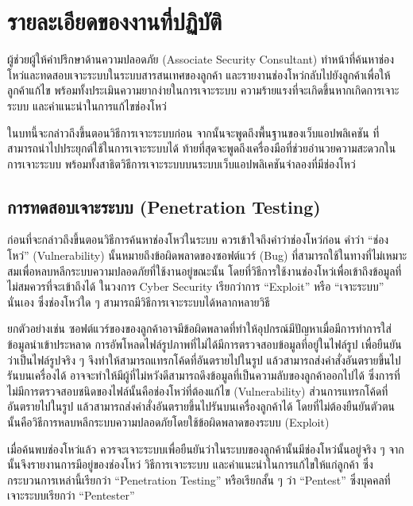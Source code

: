 \chapter{รายละเอียดของงานที่ปฏิบัติ}
\label{chapter:related-theory}

ผู้ช่วยผู้ให้คำปรึกษาด้านความปลอดภัย (Associate Security Consultant) ทำหน้าที่ค้นหาช่องโหว่และทดสอบเจาะระบบในระบบสารสนเทศของลูกค้า และรายงานช่องโหว่กลับไปยังลูกค้าเพื่อให้ลูกค้าแก้ไข พร้อมทั้งประเมินความยากง่ายในการเจาะระบบ ความร้ายแรงที่จะเกิดขึ้นหากเกิดการเจาะระบบ และคำแนะนำในการแก้ไขช่องโหว่

ในบทนี้จะกล่าวถึงขึ้นตอนวิธีการเจาะระบบก่อน จากนั้นจะพูดถึงพื้นฐานของเว็บแอปพลิเคชัน ที่สามารถนำไปประยุกต์ใช้ในการเจาะระบบได้ ท้ายที่สุดจะพูดถึงเครื่องมือที่ช่วยอำนวยความสะดวกในการเจาะระบบ พร้อมทั้งสาธิตวิธีการเจาะระบบบนระบบเว็บแอปพลิเคชันจำลองที่มีช่องโหว่

\section{การทดสอบเจาะระบบ (Penetration Testing)}

ก่อนที่จะกล่าวถึงขึ้นตอนวิธีการค้นหาช่องโหว่ในระบบ ควรเข้าใจถึงคำว่าช่องโหว่ก่อน คำว่า “ช่องโหว่” (Vulnerability) นั้นหมายถึงข้อผิดพลาดของซอฟต์แวร์ (Bug) ที่สามารถใช้ในทางที่ไม่เหมาะสมเพื่อหลบหลีกระบบความปลอดภัยที่ใช้งานอยู่ขณะนั้น โดยที่วิธีการใช้งานช่องโหว่เพื่อเข้าถึงข้อมูลที่ไม่สมควรที่จะเข้าถึงได้ ในวงการ Cyber Security เรียกว่าการ “Exploit” หรือ “เจาะระบบ” นั่นเอง \cite{what-is-an-exploit} ซึ่งช่องโหว่ใด ๆ สามารถมีวิธีการเจาะระบบได้หลากหลายวิธี

ยกตัวอย่างเช่น ซอฟต์แวร์ของของลูกค้าอาจมีข้อผิดพลาดที่ทำให้อุปกรณ์มีปัญหาเมื่อมีการทำการใส่ข้อมูลนำเข้าประหลาด การอัพโหลดไฟล์รูปภาพที่ไม่ได้มีการตรวจสอบข้อมูลที่อยู่ในไฟล์รูป เพื่อยืนยันว่าเป็นไฟล์รูปจริง ๆ จึงทำให้สามารถแทรกโค้ดที่อันตรายไปในรูป แล้วสามารถส่งคำสั่งอันตรายขึ้นไปรันบนเครื่องได้ อาจจะทำให้มีผู้ที่ไม่หวังดีสามารถดึงข้อมูลที่เป็นความลับของลูกค้าออกไปได้ ซึ่งการที่ไม่มีการตรวจสอบชนิดของไฟล์นั้นคือช่องโหว่ที่ต้องแก้ไข (Vulnerability) ส่วนการแทรกโค้ดที่อันตรายไปในรูป แล้วสามารถส่งคำสั่งอันตรายขึ้นไปรันบนเครื่องลูกค้าได้ โดยที่ไม่ต้องยืนยันตัวตนนั้นคือวิธีการหลบหลีกระบบความปลอดภัยโดยใช้ข้อผิดพลาดของระบบ (Exploit)

เมื่อค้นพบช่องโหว่แล้ว ควรจะเจาะระบบเพื่อยืนยันว่าในระบบของลูกค้านั้นมีช่องโหว่นั้นอยู่จริง ๆ จากนั้นจึงรายงานการมีอยู่ของช่องโหว่ วิธีการเจาะระบบ และคำแนะนำในการแก้ไขให้แก่ลูกค้า ซึ่งกระบวนการเหล่านี้เรียกว่า “Penetration Testing” หรือเรียกสั้น ๆ ว่า “Pentest” ซึ่งบุคคลที่เจาะระบบเรียกว่า “Pentester”

